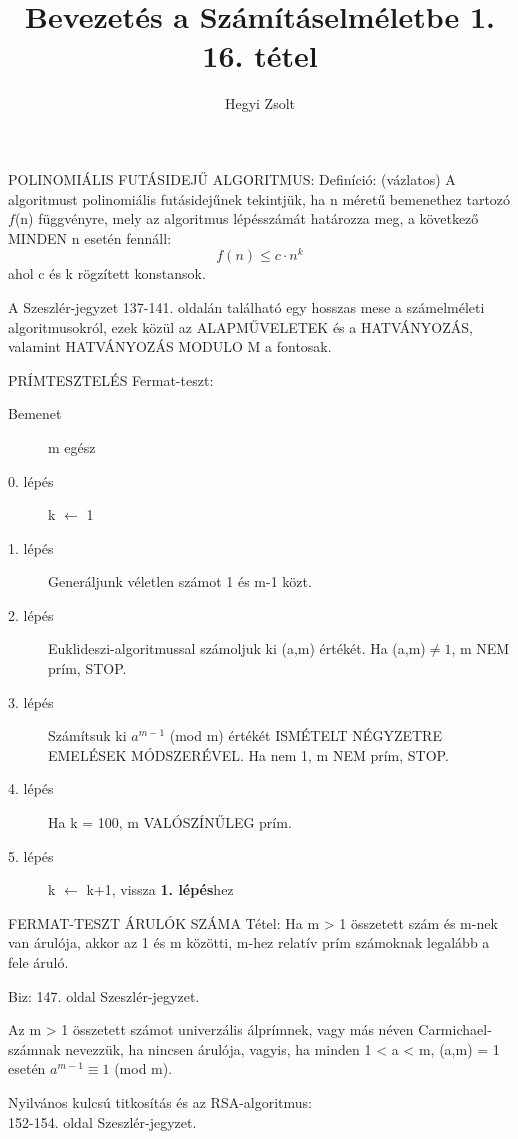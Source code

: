 \documentclass[]{article}
\title{Bevezetés a Számításelméletbe 1.\\{\large 16. tétel}}
\author{Hegyi Zsolt}
\begin{document}
\maketitle{}
\begin{shaded}
POLINOMIÁLIS FUTÁSIDEJŰ ALGORITMUS: Definíció: (vázlatos) A algoritmust polinomiális futásidejűnek tekintjük, ha n méretű bemenethez tartozó $f$(n) függvényre, mely az algoritmus lépésszámát határozza meg, a következő MINDEN n esetén fennáll:
$$f(n) \leq c\cdot n^k$$ ahol c és k rögzített konstansok.
\end{shaded}
A Szeszlér-jegyzet 137-141. oldalán található egy hosszas mese a számelméleti algoritmusokról, ezek közül az ALAPMŰVELETEK és a HATVÁNYOZÁS, valamint HATVÁNYOZÁS MODULO M a fontosak.
\begin{framed}
PRÍMTESZTELÉS Fermat-teszt:
\begin{description}
\item[Bemenet]m egész
\item[0. lépés]k $\leftarrow$ 1
\item[1. lépés]Generáljunk véletlen számot 1 és m-1 közt.
\item[2. lépés]Euklideszi-algoritmussal számoljuk ki (a,m) értékét. Ha (a,m)$\neq1$, m NEM prím, STOP.
\item[3. lépés]Számítsuk ki $a^{m-1}$ (mod m) értékét ISMÉTELT NÉGYZETRE EMELÉSEK MÓDSZERÉVEL. Ha nem 1, m NEM prím, STOP.
\item[4. lépés]Ha k = 100, m VALÓSZÍNŰLEG prím.
\item[5. lépés]k $\leftarrow$ k+1, vissza \textbf{1. lépés}hez
\end{description}
\end{framed}
\begin{framed}
FERMAT-TESZT ÁRULÓK SZÁMA Tétel: Ha m > 1 összetett szám és m-nek van árulója, akkor az 1 és m közötti, m-hez relatív prím számoknak legalább a fele áruló.
\end{framed}
\begin{leftbar}
Biz: 147. oldal Szeszlér-jegyzet.
\end{leftbar}
\begin{shaded}
Az m > 1 összetett számot univerzális álprímnek, vagy más néven Carmichael-számnak nevezzük, ha nincsen árulója, vagyis, ha minden 1 < a < m, (a,m) = 1 esetén $a^{m-1} \equiv 1$ (mod m).
\end{shaded}
Nyilvános kulcsú titkosítás és az RSA-algoritmus:\\
152-154. oldal Szeszlér-jegyzet.
\end{document}
